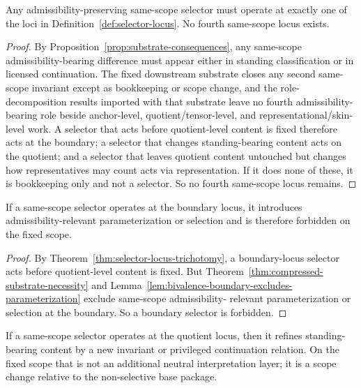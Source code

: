 \begin{theorem}
\label{thm:selector-locus-trichotomy}
Any admissibility-preserving same-scope selector must operate at exactly one of the loci in
Definition~\ref{def:selector-locus}. No fourth same-scope locus exists.
\end{theorem}

\begin{proof}
By Proposition~\ref{prop:substrate-consequences}, any same-scope admissibility-bearing difference
must appear either in standing classification or in licensed continuation. The fixed downstream
substrate closes any second same-scope invariant except as bookkeeping or scope change, and the
role-decomposition results imported with that substrate leave no fourth admissibility-bearing role
beside anchor-level, quotient/tensor-level, and representational/skin-level work. A selector that acts
before quotient-level content is fixed therefore acts at the boundary; a selector that changes
standing-bearing content acts on the quotient; and a selector that leaves quotient content untouched
but changes how representatives may count acts via representation. If it does none of these, it is
bookkeeping only and not a selector. So no fourth same-scope locus remains.
\end{proof}

\begin{corollary}
\label{cor:boundary-selectors-forbidden}
If a same-scope selector operates at the boundary locus, it introduces admissibility-relevant
parameterization or selection and is therefore forbidden on the fixed scope.
\end{corollary}

\begin{proof}
By Theorem~\ref{thm:selector-locus-trichotomy}, a boundary-locus selector acts before quotient-level
content is fixed. But Theorem~\ref{thm:compressed-substrate-necessity} and
Lemma~\ref{lem:bivalence-boundary-excludes-parameterization} exclude same-scope admissibility-
relevant parameterization or selection at the boundary. So a boundary selector is forbidden.
\end{proof}

\begin{corollary}
\label{cor:quotient-refinement-scope-change}
If a same-scope selector operates at the quotient locus, then it refines standing-bearing content by a
new invariant or privileged continuation relation. On the fixed scope that is not an additional neutral
interpretation layer; it is a scope change relative to the non-selective base package.
\end{corollary}

